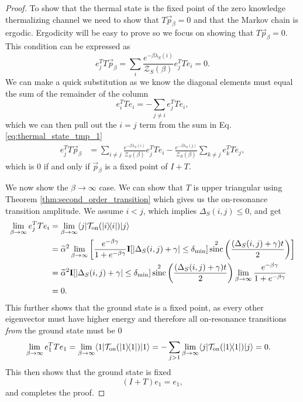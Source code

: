 \documentclass{article}
\newcommand{\on}{\rm on}
\newcommand{\ket}[1]{|#1\rangle}
\newcommand{\bra}[1]{\langle #1|}
\newcommand{\ketbra}[2]{| #1\rangle\! \langle #2|}
\newcommand{\TT}{\mathcal{T}}
\newcommand{\partfun}{\mathcal{Z}}
\DeclareMathOperator{\sinc}{sinc}
\begin{document}
\begin{proof}
    To show that the thermal state is the fixed point of the zero knowledge thermalizing channel we need to show that 
$T \vec{p}_{\beta} = 0$ and that the Markov chain is ergodic. Ergodicity will be easy to prove so we focus on showing that $T \vec{p}_{\beta} = 0$. This condition can be expressed as
\begin{equation}
    e_j^T T \vec{p}_{\beta} = \sum_i \frac{e^{-\beta \lambda_S(i)}}{\partfun_S(\beta)} e_j^T T e_i = 0.   \label{eq:thermal_state_tmp_1}
\end{equation}
We can make a quick substitution as we know the diagonal elements must equal the sum of the remainder of the column 
\begin{equation}
    e_i^T T e_i = - \sum_{j \neq i} e_j^T T e_i,
\end{equation}
which we can then pull out the $i = j$ term from the sum in Eq. \eqref{eq:thermal_state_tmp_1}
\begin{align}
    e_j^T T \vec{p}_{\beta} &= \sum_{i \neq j} \frac{e^{-\beta \lambda_S(i)}}{\partfun_S(\beta)} e_j^T T e_i - \frac{e^{-\beta \lambda_S(j)}}{\partfun_S(\beta)} \sum_{k \neq j} e_k^T T e_j,
\end{align}
which is 0 if and only if $\vec{p}_{\beta}$ is a fixed point of $I + T$.

We now show the $\beta \to \infty$ case. We can show that $T$ is upper triangular using Theorem \ref{thm:second_order_transition} which gives us the on-resonance transition amplitude. We assume $i < j$, which implies $\Delta_S(i,j) \le 0$, and get
    \begin{align}
        \lim_{\beta \to \infty} e_j^T T e_i &= \lim_{\beta \to \infty} \bra{j} \TT_{\on}(\ketbra{i}{i}) \ket{j} \\
        &= \widetilde{\alpha}^2 \lim_{\beta \to \infty} \left[ \frac{e^{-\beta \gamma}}{1 + e^{-\beta \gamma}} \mathbf{I}[|\Delta_S(i,j) + \gamma| \le \delta_{\min}] \sinc^2 \left(\frac{(\Delta_S(i, j) + \gamma) t}{2} \right) \right] \\
        &= \widetilde{\alpha}^2 \mathbf{I}[|\Delta_S(i,j) + \gamma| \le \delta_{\min}] \sinc^2 \left(\frac{(\Delta_S(i, j) + \gamma) t}{2} \right) \lim_{\beta \to \infty} \frac{e^{-\beta \gamma}}{1 + e^{-\beta \gamma}} \\
        &= 0.
    \end{align}
    This further shows that the ground state is a fixed point, as every other eigenvector must have higher energy and therefore all on-resonance transitions \emph{from} the ground state must be 0
    \begin{align}
        \lim_{\beta \to \infty} e_1^T T e_1 &= \lim_{\beta \to \infty} \bra{1} \TT_{\on}(\ketbra{1}{1}) \ket{1} = -  \sum_{j > 1} \lim_{\beta \to \infty} \bra{j} \TT_{\on}(\ketbra{1}{1}) \ket{j}  = 0.
    \end{align}
    This then shows that the ground state is fixed
    \begin{equation}
        (I + T) e_1 = e_1,
    \end{equation}
    and completes the proof.
\end{proof}
\end{document}
